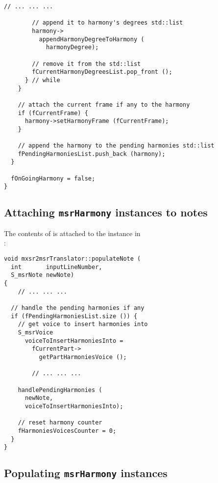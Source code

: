 \begin{lstlisting}[language=CPlusPlus]
				// ... ... ...

        // append it to harmony's degrees std::list
        harmony->
          appendHarmonyDegreeToHarmony (
            harmonyDegree);

        // remove it from the std::list
        fCurrentHarmonyDegreesList.pop_front ();
      } // while
    }

    // attach the current frame if any to the harmony
    if (fCurrentFrame) {
      harmony->setHarmonyFrame (fCurrentFrame);
    }

    // append the harmony to the pending harmonies std::list
    fPendingHarmoniesList.push_back (harmony);
  }

  fOnGoingHarmony = false;
}
\end{lstlisting}


\subsection{Attaching {\tt msrHarmony} instances to notes}

The contents of  is attached to the  instance in\\
:
\begin{lstlisting}[language=CPlusPlus]
void mxsr2msrTranslator::populateNote (
  int       inputLineNumber,
  S_msrNote newNote)
{
	// ... ... ...

  // handle the pending harmonies if any
  if (fPendingHarmoniesList.size ()) {
    // get voice to insert harmonies into
    S_msrVoice
      voiceToInsertHarmoniesInto =
        fCurrentPart->
          getPartHarmoniesVoice ();

		// ... ... ...

    handlePendingHarmonies (
      newNote,
      voiceToInsertHarmoniesInto);

    // reset harmony counter
    fHarmoniesVoicesCounter = 0;
  }
}
\end{lstlisting}


\subsection{Populating {\tt msrHarmony} instances}


